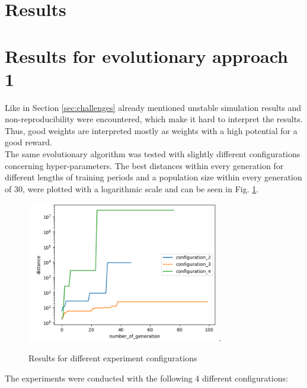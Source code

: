 \section{Results}
\label{sec:results}

\section{Results for evolutionary approach 1}
\label{sec:results_1}

Like in Section \ref{sec:challenges} already mentioned unstable simulation results and non-reproducibility were encountered, which make it hard to interpret the results. Thus, good weights are interpreted mostly as weights with a high potential for a good reward.\\
The same evolutionary algorithm was tested with slightly different configurations concerning hyper-parameters. 
The best distances within every generation for different lengths of training periods and a population size within every generation of 30, were plotted with a logarithmic scale and can be seen in Fig. \ref{fig:results_1}. 

\begin{figure}[H]
	\centering
	\includegraphics[width=3.3in]{img/results_1.png}
	\DeclareGraphicsExtensions.
	\caption{Results for different experiment configurations}
	\label{fig:results_1}
\end{figure}


The experiments were conducted with the following 4 different configurations:\\


